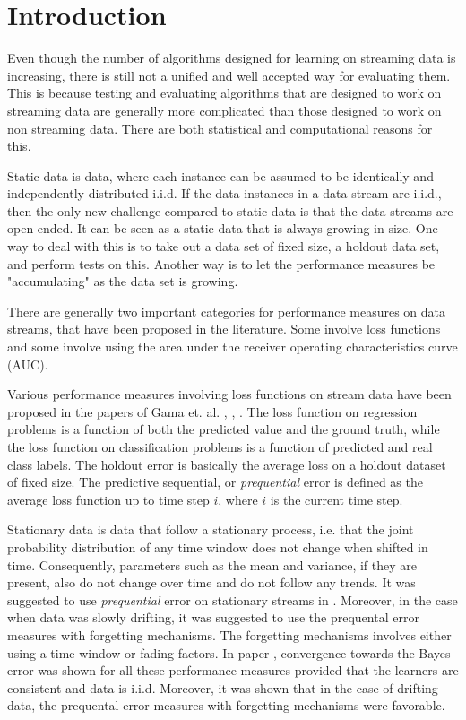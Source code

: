 \section{Introduction}

Even though the number of algorithms designed for learning on streaming data is increasing, there is still not a unified and well accepted way for evaluating them.  This is because testing and evaluating algorithms that are designed to work on streaming data are generally more complicated than those designed to work on non streaming data.  There are both statistical and computational reasons for this.  

Static data is data, where each instance can be assumed to be identically and independently distributed i.i.d. 
If the data instances in a data stream are i.i.d., then the only new challenge compared to static data is that the data streams are open ended.  It can be seen as a static data that is always growing in size.  One way to deal with this is to take out a data set of fixed size, a holdout data set, and perform tests on this.  Another way is to let the performance measures be "accumulating" as the data set is growing.  

There are generally two important categories for performance measures on data streams, that have been proposed in the literature.   Some involve loss functions and some involve using the area under the receiver operating characteristics curve (AUC). 

Various performance measures involving loss functions on stream data have been proposed in the papers of Gama et. al. \cite{Gam09}, \cite{Gam09_2}, \cite{Gam13}.  The loss function on regression problems is a function of both the predicted value and the ground truth, while the loss function on classification problems is a function of predicted and real class labels.  The holdout error is basically the average loss on a holdout dataset of fixed size.  The predictive sequential, or \emph{prequential} error is defined as the average loss function up to time step $i$, where $i$ is the current time step. 

Stationary data is data that follow a stationary process, i.e. that the joint probability distribution of any time window does not change when shifted in time. Consequently, parameters such as the mean and variance, if they are present, also do not change over time and do not follow any trends.  It was suggested to use  \emph{prequential} error on stationary streams in \cite{Gam13}.  Moreover, in the case when data was slowly drifting, it was suggested to use the prequental error measures with forgetting mechanisms. The forgetting mechanisms involves either using a time window or fading factors.  In paper \cite{Gam13}, convergence towards the Bayes error was shown for all these performance measures provided that the learners are consistent and data is i.i.d.  Moreover, it was shown that in the case of drifting data, the prequental error measures with forgetting mechanisms were favorable.

